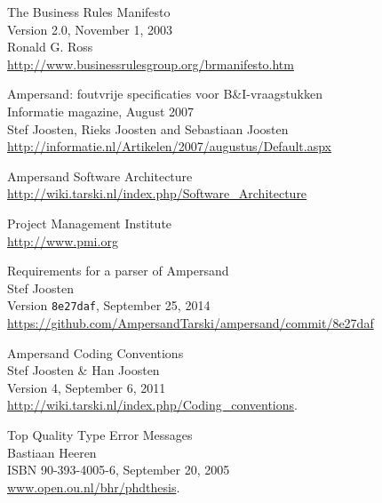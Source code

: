 \label{sec:bibliography}

\begin{thebibliography}{99}


	The Business Rules Manifesto\\
	Version 2.0, November 1, 2003\\
	Ronald G. Ross\\
	\url{http://www.businessrulesgroup.org/brmanifesto.htm}
	
	Ampersand: foutvrije specificaties voor B\&I-vraagstukken\\
	Informatie magazine, August 2007\\
	Stef Joosten, Rieks Joosten and Sebastiaan Joosten\\
	\url{http://informatie.nl/Artikelen/2007/augustus/Default.aspx}  %
	
	Ampersand Software Architecture\\
	\url{http://wiki.tarski.nl/index.php/Software_Architecture}
	
	Project Management Institute\\
	\url{http://www.pmi.org}
	
	Requirements for a parser of Ampersand\\
	Stef Joosten\\
	Version \texttt{8e27daf}, September 25, 2014\\
	\url{https://github.com/AmpersandTarski/ampersand/commit/8e27daf}
	
	Ampersand Coding Conventions\\
	Stef Joosten \& Han Joosten\\
	Version 4, September 6, 2011\\
	\url{http://wiki.tarski.nl/index.php/Coding\_conventions}.

	Top Quality Type Error Messages\\
	Bastiaan Heeren\\
	ISBN 90-393-4005-6, September 20, 2005\\
	\url{www.open.ou.nl/bhr/phdthesis}.
	

\end{thebibliography}
